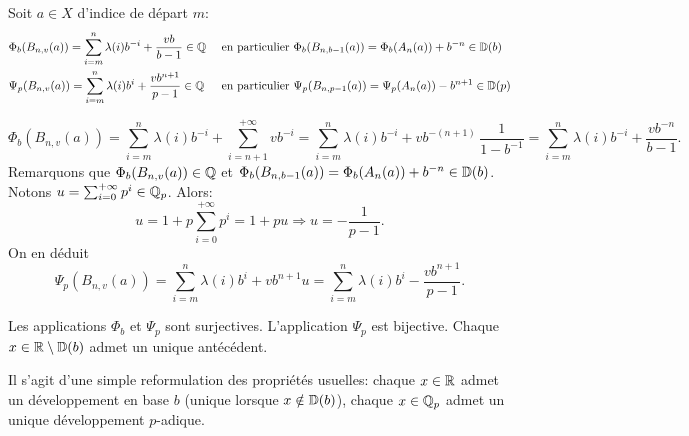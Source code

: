 \begin{exple}
Soit $a \in X$ d'indice de départ $m$:
\begin{align*}
 &\Phi_b(B_{n,v}(a)) = \sum_{i=m}^n \lambda(i)b^{-i} + \frac{vb}{b -1}\in \mathbb{Q} &\text{ en particulier }& \Phi_b(B_{n,b-1}(a)) = \Phi_b(A_{n}(a)) + b^{-n} \in \mathbb{D}(b)\\
 &\Psi_p(B_{n,v}(a)) = \sum_{i=m}^n \lambda(i)b^{i} + \frac{vb^{n+1}}{p-1}\in\mathbb{Q} &\text{ en particulier }& \Psi_p(B_{n,p-1}(a)) = \Psi_p(A_{n}(a)) - b^{n+1} \in \mathbb{D}(p)
\end{align*}
\end{exple}
\begin{demo}
 \begin{displaymath}
  \Phi_b(B_{n,v}(a)) = \sum_{i=m}^n \lambda(i)b^{-i} + \sum_{i=n+1}^{+\infty} vb^{-i}
  = \sum_{i=m}^n \lambda(i)b^{-i} + vb^{-(n+1)}\, \frac{1}{1 - b^{-1}}
  = \sum_{i=m}^n \lambda(i)b^{-i} + \frac{vb^{-n}}{b -1}.
 \end{displaymath}
 Remarquons que $\Phi_b(B_{n,v}(a)) \in \mathbb{Q}$ et $\Phi_b(B_{n,b-1}(a)) = \Phi_b(A_{n}(a)) + b^{-n} \in \mathbb{D}(b)$.\newline
 Notons $u = \sum_{i=0}^{+\infty} p^i \in \mathbb{Q}_p$. Alors:
 \begin{displaymath}
  u = 1 + p \sum_{i=0}^{+\infty} p^i = 1+ pu \Rightarrow u = - \frac{1}{p-1}.
 \end{displaymath}
On en déduit
\begin{displaymath}
 \Psi_p(B_{n,v}(a)) = \sum_{i=m}^n \lambda(i)b^{i} + vb^{n+1}u = \sum_{i=m}^n \lambda(i)b^{i} - \frac{vb^{n+1}}{p-1}.
\end{displaymath}

\end{demo}

\begin{prop}
 Les applications $\Phi_b$ et $\Psi_p$ sont surjectives. L'application $\Psi_p$ est bijective. Chaque $x\in \mathbb{R} \setminus \mathbb{D}(b)$ admet un unique antécédent.
\end{prop}
\begin{demo}
 Il s'agit d'une simple reformulation des propriétés usuelles: chaque $x \in \mathbb{R}$ admet un développement en base $b$ (unique lorsque $x\notin \mathbb{D}(b)$), chaque $x \in \mathbb{Q}_p$ admet un unique développement $p$-adique.
\end{demo}

